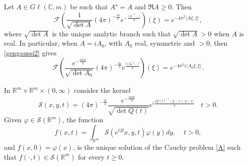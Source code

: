 \documentclass[10pt,a4paper]{amsart}
\newcommand{\Rm}{\mathbb R^m}
\newcommand{\da}{\rangle}
\newcommand{\sa}{\langle}
\newcommand{\vf}{\varphi}
\begin{document}
\begin{proposition}\label{P:ftgaussian}
Let $A\in G\ell(\mathbb C,m)$ be such that $A^\star = A$ and $\Re A \ge 0$. Then 
\begin{equation}\label{gengaussi2}
\mathscr F\left(\frac{1}{\sqrt{\operatorname{det} A}}(4\pi
)^{-\frac{m}{2}} e^{- \frac{\sa A^{-1}\cdot,\cdot\da}{4}}\right)(\xi) =
e^{- 4 \pi^2  \sa A\xi,\xi\da},
\end{equation}
where $\sqrt{\operatorname{det} A}$ is the unique analytic branch such that $\sqrt{\operatorname{det} A}>0$ when $A$ is real. In particular, when $A = i A_0$, with $A_0$ real, symmetric and $>0$, then \eqref{gengaussi2} gives
\begin{equation}\label{imgaussian}
\mathscr F\left(\frac{e^{-\frac{i m\pi}4}}{\sqrt{\operatorname{det} A_0}}(4\pi
)^{-\frac{m}{2}} e^{\frac{i \sa A_0^{-1}\cdot,\cdot\da}{4}}\right)(\xi) =
e^{- 4 \pi^2 i  \sa A_0\xi,\xi\da}.
\end{equation}
\end{proposition}

\begin{proposition}\label{P:erwin}
In $\Rm\times \Rm\times (0,\infty)$ consider the kernel
\begin{equation}\label{Skolmo}
\mathcal S(x,y,t) = 
(4\pi
)^{-\frac{m}{2}} \frac{e^{-\frac{i m\pi}4}}{\sqrt{\det Q(t)}}   e^{i \frac{\sa Q(t)^{-1}(y-x),y-x\da}{4}}\ \ \ \ t>0.
\end{equation}
Given $\vf\in \mathscr S(\Rm)$, the function
\begin{equation}\label{reallyfinal}
f(x,t) = 
\int_{\Rm} \mathcal S(e^{t B} x,y,t) \vf(y) dy,\ \ \ \ \ t>0,
\end{equation}
and $f(x,0) = \vf(x)$, 
is the unique solution of the Cauchy problem \eqref{A} such that $f(\cdot,t)\in \mathscr S(\Rm)$ for every $t\ge 0$.
\end{proposition}
\end{document}
